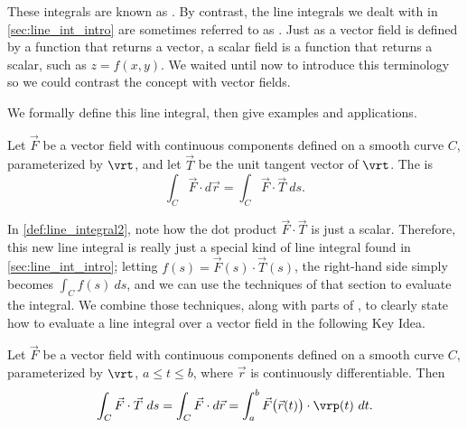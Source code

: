 These integrals are known as . By contrast, the line integrals we dealt with in \autoref{sec:line_int_intro} are sometimes referred to as . Just as a vector field is defined by a function that returns a vector, a scalar field is a function that returns a scalar, such as $z = f(x,y)$. We waited until now to introduce this terminology so we could contrast the concept with vector fields. 

We formally define this line integral, then give examples and applications.

\begin{definition}\label{def:line_integral2}
Let $\vec F$ be a vector field with continuous components defined on a smooth curve $C$, parameterized by $\vrt$, and let $\vec T$ be the unit tangent vector of $\vrt$. The  is
\[\int_C \vec F\cdot d\vec r = \int_C \vec F\cdot\vec T\ ds.\]
\end{definition}


In \autoref{def:line_integral2}, note how the dot product $\vec F \cdot \vec T$ is just a scalar. %
Therefore, this new line integral is really just a special kind of line integral found in \autoref{sec:line_int_intro}; letting $f(s) = \vec F(s)\cdot \vec T(s)$, the right-hand side simply becomes $\int_C f(s)\ ds$, and we can use the techniques of that section to evaluate the integral. We combine those techniques, along with parts of , to clearly state how to evaluate a line integral over a vector field in the following Key Idea. 

\begin{keyidea}\label{idea:line2}
Let $\vec F$ be a vector field with continuous components defined on a smooth curve $C$, parameterized by $\vrt$, $a\leq t\leq b$, where $\vec r$ is continuously differentiable. Then
	\[
	\int_C\vec F\cdot\vec T\ ds = \int_C \vec F\cdot d\vec r
	=\int_a^b \vec F\big(\vec r(t)\big) \cdot \vrp(t)\ dt.
	\]
\end{keyidea}

